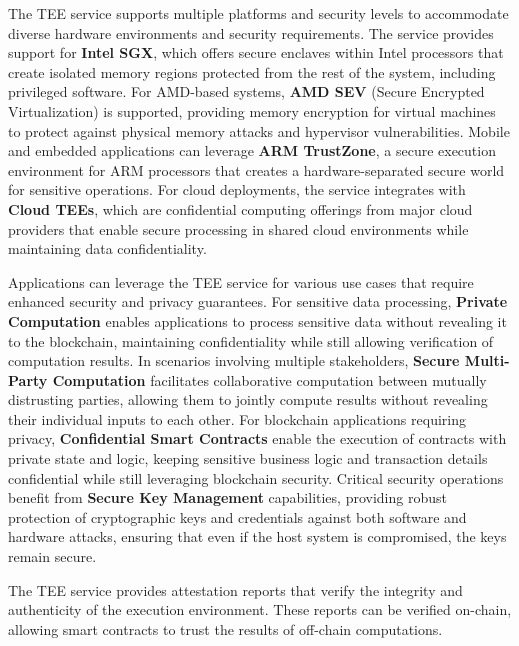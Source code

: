 \documentclass[11pt]{article}
\begin{document}
The TEE service supports multiple platforms and security levels to accommodate diverse hardware environments and security requirements. The service provides support for \textbf{Intel SGX}, which offers secure enclaves within Intel processors that create isolated memory regions protected from the rest of the system, including privileged software. For AMD-based systems, \textbf{AMD SEV} (Secure Encrypted Virtualization) is supported, providing memory encryption for virtual machines to protect against physical memory attacks and hypervisor vulnerabilities. Mobile and embedded applications can leverage \textbf{ARM TrustZone}, a secure execution environment for ARM processors that creates a hardware-separated secure world for sensitive operations. For cloud deployments, the service integrates with \textbf{Cloud TEEs}, which are confidential computing offerings from major cloud providers that enable secure processing in shared cloud environments while maintaining data confidentiality.

Applications can leverage the TEE service for various use cases that require enhanced security and privacy guarantees. For sensitive data processing, \textbf{Private Computation} enables applications to process sensitive data without revealing it to the blockchain, maintaining confidentiality while still allowing verification of computation results. In scenarios involving multiple stakeholders, \textbf{Secure Multi-Party Computation} facilitates collaborative computation between mutually distrusting parties, allowing them to jointly compute results without revealing their individual inputs to each other. For blockchain applications requiring privacy, \textbf{Confidential Smart Contracts} enable the execution of contracts with private state and logic, keeping sensitive business logic and transaction details confidential while still leveraging blockchain security. Critical security operations benefit from \textbf{Secure Key Management} capabilities, providing robust protection of cryptographic keys and credentials against both software and hardware attacks, ensuring that even if the host system is compromised, the keys remain secure.

The TEE service provides attestation reports that verify the integrity and authenticity of the execution environment. These reports can be verified on-chain, allowing smart contracts to trust the results of off-chain computations.
\end{document}
